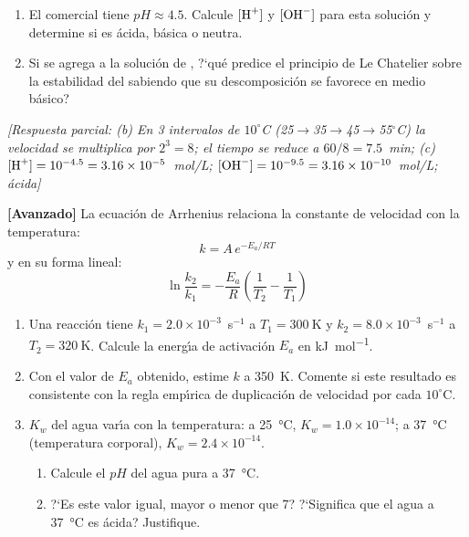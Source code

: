\begin{bloque_ejercicios}
\begin{ejercicios}
\begin{enumerate}[label=\alph*)]
    \item El  comercial tiene $pH \approx 4.5$.
          Calcule $[\ce{H+}]$ y $[\ce{OH^-}]$ para esta soluci\'on
          y determine si es \'acida, b\'asica o neutra.

    \item Si se agrega  a la soluci\'on de ,
          ?`qu\'e predice el principio de Le Chatelier sobre
          la estabilidad del  sabiendo que su
          descomposici\'on se favorece en medio b\'asico?
\end{enumerate}

\textit{[Respuesta parcial:
(b) En 3 intervalos de $10^\circ$C (25$\to$35$\to$45$\to$55$^\circ$C)
    la velocidad se multiplica por $2^3=8$; el tiempo se reduce a
    $60/8 = 7.5$~min;
(c) $[\ce{H+}] = 10^{-4.5} = 3.16\times10^{-5}$~mol/L;
    $[\ce{OH^-}] = 10^{-9.5} = 3.16\times10^{-10}$~mol/L; \'acida]}

\item \textbf{[Avanzado]} La ecuaci\'on de Arrhenius relaciona la
constante de velocidad con la temperatura:
\[
    k = A\,e^{-E_a/RT}
\]
y en su forma lineal:
\[
    \ln\frac{k_2}{k_1} = -\frac{E_a}{R}\left(\frac{1}{T_2}
    - \frac{1}{T_1}\right)
\]

\begin{enumerate}[label=\alph*)]
    \item Una reacci\'on tiene $k_1 = 2.0\times10^{-3}$~s$^{-1}$
          a $T_1 = \SI{300}{\kelvin}$ y $k_2 = 8.0\times10^{-3}$~s$^{-1}$
          a $T_2 = \SI{320}{\kelvin}$. Calcule la energ\'{\i}a de
          activaci\'on $E_a$ en \si{\kilo\joule\per\mole}.

    \item Con el valor de $E_a$ obtenido, estime $k$ a
          \SI{350}{\kelvin}. Comente si este resultado es
          consistente con la regla emp\'{\i}rica de duplicaci\'on
          de velocidad por cada $10^\circ$C.

    \item $K_w$ del agua var\'{\i}a con la temperatura:
          a \SI{25}{\celsius}, $K_w = 1.0\times10^{-14}$;
          a \SI{37}{\celsius} (temperatura corporal),
          $K_w = 2.4\times10^{-14}$.
          \begin{enumerate}[label=\roman*)]
              \item Calcule el $pH$ del agua pura
                    a \SI{37}{\celsius}.
              \item ?`Es este valor igual, mayor o menor que 7?
                    ?`Significa que el agua a \SI{37}{\celsius}
                    es \'acida? Justifique.
          \end{enumerate}


\end{enumerate}
\end{ejercicios}
\end{bloque_ejercicios}
